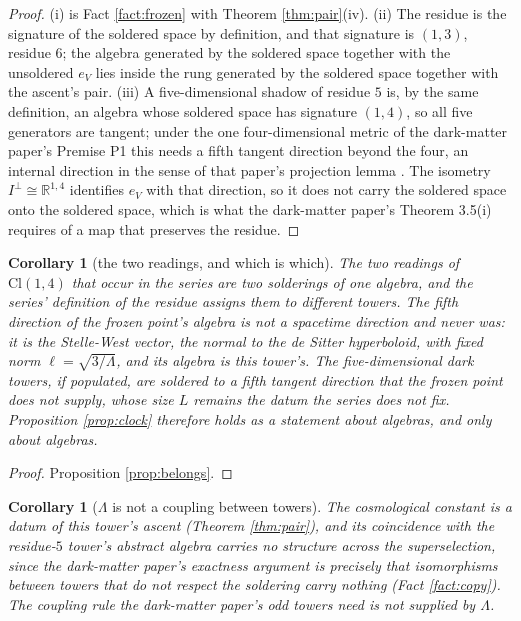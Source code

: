 \documentclass[11pt]{article}
\newtheorem{corollary}[theorem]{Corollary}
\theoremstyle{definition}
\newcommand{\Cl}{\mathrm{Cl}}
\newcommand{\R}{\mathbb{R}}
\begin{document}
\begin{proof}
(i) is Fact \ref{fact:frozen} with Theorem \ref{thm:pair}(iv). (ii) The residue is the signature of the soldered space by definition, and that signature is $(1,3)$, residue $6$; the algebra generated by the soldered space together with the unsoldered $e_{V}$ lies inside the rung generated by the soldered space together with the ascent's pair. (iii) A five-dimensional shadow of residue $5$ is, by the same definition, an algebra whose soldered space has signature $(1,4)$, so all five generators are tangent; under the one four-dimensional metric of the dark-matter paper's Premise P1 this needs a fifth tangent direction beyond the four, an internal direction in the sense of that paper's projection lemma \cite[Lem.~6.1]{ButlerT14}. The isometry $I^{\perp} \cong \R^{1,4}$ identifies $e_{V}$ with that direction, so it does not carry the soldered space onto the soldered space, which is what the dark-matter paper's Theorem 3.5(i) requires of a map that preserves the residue.
\end{proof}

\begin{corollary}[the two readings, and which is which]\label{cor:readings}
The two readings of $\Cl(1,4)$ that occur in the series are two solderings of one algebra, and the series' definition of the residue assigns them to different towers. The fifth direction of the frozen point's algebra is not a spacetime direction and never was: it is the Stelle-West vector, the normal to the de Sitter hyperboloid, with fixed norm $\ell = \sqrt{3/\Lambda}$, and its algebra is this tower's. The five-dimensional dark towers, if populated, are soldered to a fifth tangent direction that the frozen point does not supply, whose size $L$ remains the datum the series does not fix. Proposition \ref{prop:clock} therefore holds as a statement about algebras, and only about algebras.
\end{corollary}

\begin{proof}
Proposition \ref{prop:belongs}.
\end{proof}

\begin{corollary}[$\Lambda$ is not a coupling between towers]\label{cor:nocoupling}
The cosmological constant is a datum of this tower's ascent (Theorem \ref{thm:pair}), and its coincidence with the residue-$5$ tower's abstract algebra carries no structure across the superselection, since the dark-matter paper's exactness argument is precisely that isomorphisms between towers that do not respect the soldering carry nothing (Fact \ref{fact:copy}). The coupling rule the dark-matter paper's odd towers need is not supplied by $\Lambda$.
\end{corollary}
\end{document}
